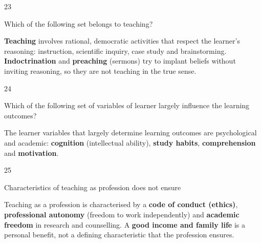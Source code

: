\begin{question}{23}
{Which of the following set belongs to teaching?\par}
\begin{explain}
\textbf{Teaching} involves rational, democratic activities that respect the learner's reasoning: instruction, scientific inquiry, case study and brainstorming. \textbf{Indoctrination} and \textbf{preaching} (sermons) try to implant beliefs without inviting reasoning, so they are not teaching in the true sense.
\end{explain}
\end{question}

\begin{question}{24}
{Which of the following set of variables of learner largely influence the learning outcomes?\par}
\begin{explain}
The learner variables that largely determine learning outcomes are psychological and academic: \textbf{cognition} (intellectual ability), \textbf{study habits}, \textbf{comprehension} and \textbf{motivation}.
\end{explain}
\end{question}

\begin{question}{25}
{Characteristics of teaching as profession does not ensure\par}
\begin{explain}
Teaching as a profession is characterised by a \textbf{code of conduct (ethics)}, \textbf{professional autonomy} (freedom to work independently) and \textbf{academic freedom} in research and counselling. A \textbf{good income and family life} is a personal benefit, not a defining characteristic that the profession ensures.
\end{explain}
\end{question}

